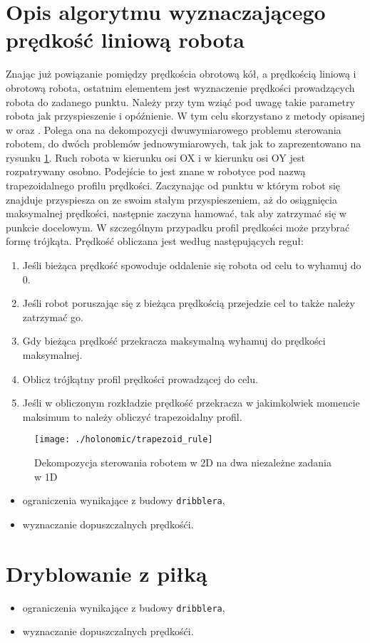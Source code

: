 \section{Opis algorytmu wyznaczającego prędkość liniową robota}

Znając już powiązanie pomiędzy prędkościa obrotową kół, a prędkością liniową i obrotową robota, ostatnim elementem jest wyznaczenie prędkości prowadzących 
robota do zadanego punktu. Należy przy tym wziąć pod uwagę takie parametry robota jak przyspieszenie i opóźnienie. W tym celu skorzystano z metody opisanej w 
\cite{trapezy1} oraz \cite{trapezy2}. Polega ona na dekompozycji dwuwymiarowego problemu sterowania robotem, do dwóch problemów jednowymiarowych, tak jak to zaprezentowano
na rysunku \ref{fig:trapezoid_rule}. Ruch robota w kierunku osi OX i w kierunku osi OY jest rozpatrywany osobno. 
Podejście to jest znane w robotyce pod nazwą trapezoidalnego profilu prędkości.
Zaczynając od punktu w którym robot się znajduje przyspiesza on
ze swoim stałym przyspieszeniem, aż do osiągnięcia maksymalnej prędkości, następnie zaczyna hamować, tak aby zatrzymać się w punkcie docelowym.
W szczególnym przypadku profil prędkości może przybrać formę trójkąta.
Prędkość obliczana jest według następujących reguł:
\begin{enumerate}
\item Jeśli bieżąca prędkość spowoduje oddalenie się robota od celu to wyhamuj do 0.
\item Jeśli robot poruszając się z bieżąca prędkością przejedzie cel to także należy zatrzymać go.
\item Gdy bieżąca prędkość przekracza maksymalną wyhamuj do prędkości maksymalnej.
\item Oblicz trójkątny profil prędkości prowadzącej do celu.
\item Jeśli w obliczonym rozkładzie prędkość przekracza w jakimkolwiek momencie maksimum to należy obliczyć trapezoidalny profil. 
\end{enumerate} 

\begin{figure}[h]
\centering
\texttt{[image: ./holonomic/trapezoid\_rule]}
\caption{ Dekompozycja sterowania robotem w 2D na dwa niezależne zadania w 1D }\label{fig:trapezoid_rule}
\end{figure}


\begin{itemize}
 \item ograniczenia wynikające z budowy \texttt{dribblera},
 \item wyznaczanie dopuszczalnych prędkośći.
\end{itemize}

\section{Dryblowanie z piłką}
\begin{itemize}
 \item ograniczenia wynikające z budowy \texttt{dribblera},
 \item wyznaczanie dopuszczalnych prędkośći.
\end{itemize}

